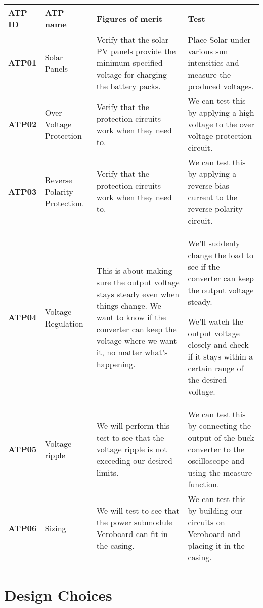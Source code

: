 \documentclass[class=report,11pt,crop=false]{standalone}
\begin{document}
\begin{table}
\centering

\begin{tabular}{| l | l | l | l |}
\hline
\textbf{ATP ID} & \textbf{ATP name} & \textbf{Figures of merit} & \textbf{Test} \\
\hline
\textbf{ATP01} & Solar Panels & Verify that the solar PV panels provide the minimum specified voltage for charging the battery packs.

  & Place Solar under various sun intensities and measure the produced voltages. \\
\hline
\textbf{ATP02} & Over Voltage Protection & Verify that the protection circuits work when they need to. & We can test this by applying a high voltage to the over voltage protection circuit. \\
\hline
\textbf{ATP03} & Reverse Polarity Protection. & Verify that the protection circuits work when they need to. & We can test this by applying a reverse bias current to the reverse polarity circuit. \\
\hline
\textbf{ATP04} & Voltage Regulation & This is about making sure the output voltage stays steady even when things change. We want to know if the converter can keep the voltage where we want it, no matter what's happening. & We'll suddenly change the load to see if the converter can keep the output voltage steady.

We'll watch the output voltage closely and check if it stays within a certain range of the desired voltage. \\
\hline
\textbf{ATP05} & Voltage ripple & We will perform this test to see that the voltage ripple is not exceeding our desired limits. & We can test this by connecting the output of the buck converter to the oscilloscope and using the measure function. \\
\hline
\textbf{ATP06} & Sizing & We will test to see that the power submodule Veroboard can fit in the casing. & We can test this by building our circuits on Veroboard and placing it in the casing. \\
\hline

\end{tabular}

\end{table}

     

\section{Design Choices}
\end{document}
